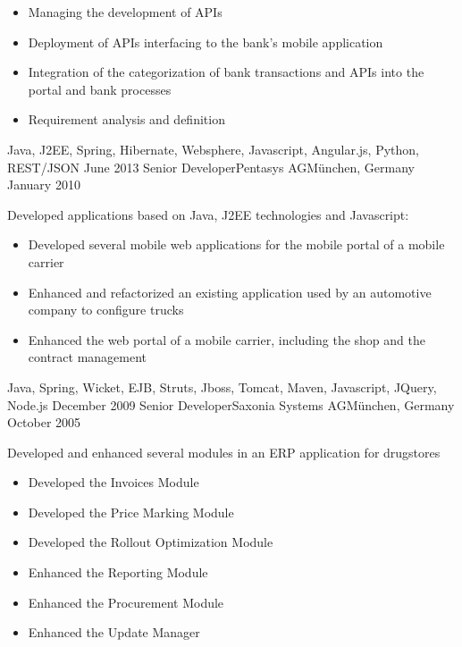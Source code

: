 \begin{experiences}
{\begin{itemize}
                        \item Managing the development of APIs
                        \item Deployment of APIs interfacing to the bank's mobile application 
                        \item Integration of the categorization of bank transactions and APIs into the portal and bank processes
						 \item Requirement analysis and definition                                                
                      \end{itemize}
                    }
                    {Java, J2EE, Spring, Hibernate, Websphere, Javascript, Angular.js, Python, REST/JSON}
  \emptySeparator
  \experience
    {June 2013}    {Senior Developer}{Pentasys AG}{München, Germany}
    {January 2010} {Developed applications based on Java, J2EE technologies and Javascript:   
                      \begin{itemize}
                        \item Developed several mobile web applications for the mobile portal of a mobile carrier
                        \item Enhanced and refactorized an existing application used by an automotive company to configure trucks                 
                        \item Enhanced the web portal of a mobile carrier, including the shop and the contract management
                      \end{itemize}
                    }
                    {Java, Spring, Wicket, EJB, Struts, Jboss, Tomcat, Maven, Javascript, JQuery, Node.js}
  \emptySeparator
  \experience
  {December 2009}   {Senior Developer}{Saxonia Systems AG}{München, Germany}
  {October 2005}    {
  					    Developed and enhanced several modules in an ERP application for drugstores
  					    \begin{itemize}
                        	\item Developed the Invoices Module
							\item Developed the Price Marking Module
							\item Developed the Rollout Optimization Module
                        	\item Enhanced the Reporting Module
                        	\item Enhanced the Procurement Module
    						\item Enhanced the Update Manager
                    	\end{itemize}
}
\end{experiences}
